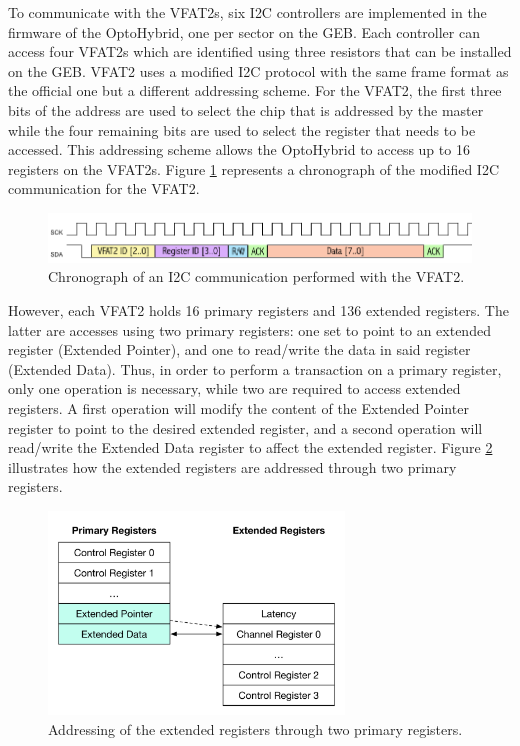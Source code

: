       To communicate with the VFAT2s, six I2C controllers are implemented in the firmware of the OptoHybrid, one per sector on the GEB. Each controller can access four VFAT2s which are identified using three resistors that can be installed on the GEB. VFAT2 uses a modified I2C protocol with the same frame format as the official one but a different addressing scheme. For the VFAT2, the first three bits of the address are used to select the chip that is addressed by the master while the four remaining bits are used to select the register that needs to be accessed. This addressing scheme allows the OptoHybrid to access up to 16 registers on the VFAT2s. Figure \ref{fig:II-3-i2c-vfat2} represents a chronograph of the modified I2C communication for the VFAT2. \\

      \begin{figure}[h!]
        \centering
        \includegraphics[width=\textwidth]{img/II-3-test-beam/i2c-vfat2.png}
        \caption{Chronograph of an I2C communication performed with the VFAT2.}
        \label{fig:II-3-i2c-vfat2}
      \end{figure}

      However, each VFAT2 holds 16 primary registers and 136 extended registers. The latter are accesses using two primary registers: one set to point to an extended register (Extended Pointer), and one to read/write the data in said register (Extended Data). Thus, in order to perform a transaction on a primary register, only one operation is necessary, while two are required to access extended registers. A first operation will modify the content of the Extended Pointer register to point to the desired extended register, and a second operation will read/write the Extended Data register to affect the extended register. Figure \ref{fig:II-3-i2c-extended} illustrates how the extended registers are addressed through two primary registers. \\

      \begin{figure}[h!]
        \centering
        \includegraphics[width=0.7\textwidth]{img/II-3-test-beam/i2c-extended}
        \caption{Addressing of the extended registers through two primary registers.}
        \label{fig:II-3-i2c-extended}
      \end{figure}

